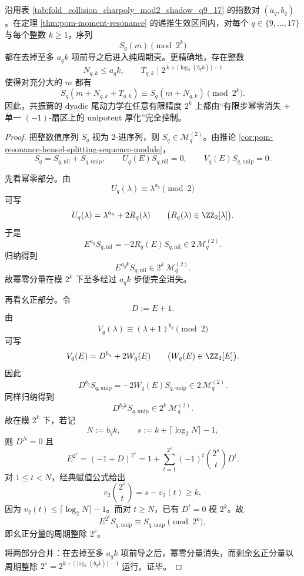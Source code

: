 \begin{theorem}\label{thm:conclusion-resonance-window-z2-hensel-tail-periodicity}
沿用表 \ref{tab:fold_collision_charpoly_mod2_shadow_q9_17} 的指数对 \((a_q,b_q)\)。在定理 \ref{thm:pom-moment-resonance} 的递推生效区间内，对每个 \(q\in\{9,\dots,17\}\) 与每个整数 \(k\ge 1\)，序列
\[
S_q(m)\pmod{2^k}
\]
都在去掉至多 \(a_qk\) 项前导之后进入纯周期壳。更精确地，存在整数
\[
N_{q,k}\le a_qk,
\qquad
T_{q,k}\mid 2^{\,k+\lceil\log_2(b_qk)\rceil-1}
\]
使得对充分大的 \(m\) 都有
\[
S_q(m+N_{q,k}+T_{q,k})
\equiv
S_q(m+N_{q,k})
\pmod{2^k}.
\]
因此，共振窗的 dyadic 尾动力学在任意有限精度 \(2^k\) 上都由“有限步幂零消失 + 单一 \((-1)\)-扇区上的 unipotent 厚化”完全控制。
\end{theorem}
\begin{proof}
把整数值序列 \(S_q\) 视为 \(2\)-进序列，则 \(S_q\in \mathscr M_q^{(2)}\)。由推论 \ref{cor:pom-resonance-hensel-splitting-sequence-module}，
\[
S_q=S_{q,\mathrm{nil}}+S_{q,\mathrm{unip}},
\qquad
U_q(E)S_{q,\mathrm{nil}}=0,
\qquad
V_q(E)S_{q,\mathrm{unip}}=0.
\]

先看幂零部分。由
\[
U_q(\lambda)\equiv \lambda^{a_q}\pmod 2
\]
可写
\[
U_q(\lambda)=\lambda^{a_q}+2R_q(\lambda)
\qquad
\bigl(R_q(\lambda)\in \ZZ_2[\lambda]\bigr).
\]
于是
\[
E^{a_q}S_{q,\mathrm{nil}}
=
-2R_q(E)S_{q,\mathrm{nil}}
\in
2\,\mathscr M_q^{(2)}.
\]
归纳得到
\[
E^{a_qk}S_{q,\mathrm{nil}}\in 2^k\,\mathscr M_q^{(2)}.
\]
故幂零分量在模 \(2^k\) 下至多经过 \(a_qk\) 步便完全消失。

再看幺正部分。令
\[
D:=E+1.
\]
由
\[
V_q(\lambda)\equiv (\lambda+1)^{b_q}\pmod 2
\]
可写
\[
V_q(E)=D^{b_q}+2W_q(E)
\qquad
\bigl(W_q(E)\in \ZZ_2[E]\bigr).
\]
因此
\[
D^{b_q}S_{q,\mathrm{unip}}
=
-2W_q(E)S_{q,\mathrm{unip}}
\in
2\,\mathscr M_q^{(2)}.
\]
同样归纳得到
\[
D^{b_qk}S_{q,\mathrm{unip}}\in 2^k\,\mathscr M_q^{(2)}.
\]
故在模 \(2^k\) 下，若记
\[
N:=b_qk,
\qquad
s:=k+\lceil\log_2 N\rceil-1,
\]
则 \(D^N=0\) 且
\[
E^{2^s}=(-1+D)^{2^s}
=
1+\sum_{t=1}^{2^s}(-1)^t\binom{2^s}{t}D^t.
\]
对 \(1\le t<N\)，经典赋值公式给出
\[
v_2\!\binom{2^s}{t}=s-v_2(t)\ge k,
\]
因为 \(v_2(t)\le \lceil\log_2 N\rceil-1\)。而对 \(t\ge N\)，已有 \(D^t=0\) 模 \(2^k\)。故
\[
E^{2^s}S_{q,\mathrm{unip}}\equiv S_{q,\mathrm{unip}}\pmod{2^k},
\]
即幺正分量的周期整除 \(2^s\)。

将两部分合并：在去掉至多 \(a_qk\) 项前导之后，幂零分量消失，而剩余幺正分量以周期整除 \(2^s=2^{k+\lceil\log_2(b_qk)\rceil-1}\) 运行。证毕。
\end{proof}

